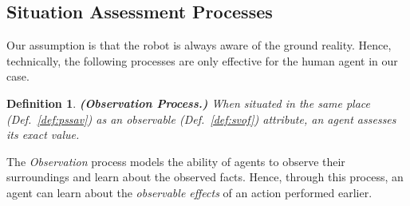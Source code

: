 \documentclass[letterpaper]{article} %
\newtheorem{definition}{Definition}
\begin{document}
\subsection{Situation Assessment Processes}
Our assumption is that the robot is always aware of the ground reality. 
Hence, technically, the following processes are only effective for the human agent in our case. 

\begin{definition} 
\label{def:obs}
    \textbf{(Observation Process.)} When situated in the same place (Def.~\ref{def:pssav}) as an observable (Def.~\ref{def:svof}) attribute, an agent assesses its exact value.  
\end{definition}



The \textit{Observation} process models the ability of agents to observe their surroundings and 
learn about
the observed facts. Hence, through this process, an agent can learn about the \textit{observable effects} of an action performed earlier. 
\end{document}
